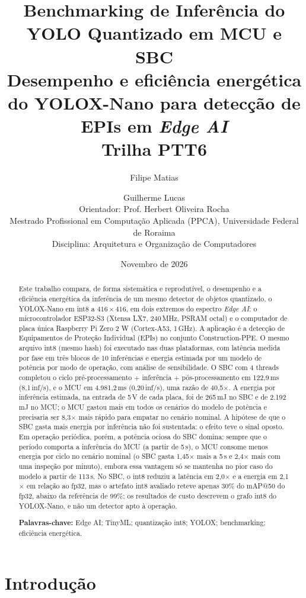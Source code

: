 \documentclass[11pt,a4paper]{article}
\title{\textbf{Benchmarking de Inferência do YOLO Quantizado em MCU e SBC}\\[2pt]
\large Desempenho e eficiência energética do YOLOX-Nano para detecção de EPIs em \emph{Edge AI}\\[2pt]
\normalsize Trilha PTT6}
\author{Filipe Matias \and Guilherme Lucas\\[2pt]
\small Orientador: Prof. Herbert Oliveira Rocha\\
\small Mestrado Profissional em Computação Aplicada (PPCA), Universidade Federal de Roraima\\
\small Disciplina: Arquitetura e Organização de Computadores}
\date{Novembro de 2026}
\begin{document}
\maketitle

\begin{abstract}
\noindent Este trabalho compara, de forma sistemática e reprodutível, o desempenho e a eficiência energética da
inferência de um mesmo detector de objetos quantizado, o YOLOX-Nano em int8 a $416\times416$, em dois
extremos do espectro \emph{Edge AI}: o microcontrolador ESP32-S3 (Xtensa LX7, 240\,MHz, PSRAM octal) e o
computador de placa única Raspberry Pi Zero 2 W (Cortex-A53, 1\,GHz). A aplicação é a detecção de Equipamentos de
Proteção Individual (EPIs) no conjunto Construction-PPE. O mesmo arquivo int8 (mesmo hash) foi executado nas duas
plataformas, com latência medida por fase em três blocos de 10 inferências e energia estimada por um modelo de
potência por modo de operação, com análise de sensibilidade. O SBC com 4 threads completou o ciclo
pré-processamento $+$ inferência $+$ pós-processamento em 122,9\,ms (8,1\,inf/s), e o MCU em 4.981,2\,ms
(0,20\,inf/s), uma razão de 40,5$\times$. A energia por inferência estimada, na entrada de 5\,V de cada placa, foi de 265\,mJ no SBC e de 2.192\,mJ no
MCU; o MCU gastou mais em todos os cenários do modelo de potência e precisaria ser 8,3$\times$ mais rápido para
empatar no cenário nominal. A hipótese de que o SBC gasta mais energia por inferência não foi sustentada: o efeito
teve o sinal oposto. Em operação periódica, porém, a potência ociosa do SBC domina: sempre que o período comporta
a inferência do MCU (a partir de 5\,s), o MCU consome menos energia por ciclo no cenário nominal (o SBC gasta 1,45$\times$ mais
a 5\,s e 2,4$\times$ mais com uma inspeção por minuto), embora essa vantagem só se mantenha no pior caso do modelo a
partir de 113\,s. No SBC, o int8 reduziu a latência em 2,0$\times$ e a energia em 2,1$\times$ em relação ao fp32,
mas o artefato int8 avaliado reteve apenas 30\% do mAP@50 do fp32, abaixo da referência de 99\%; os resultados de
custo descrevem o grafo int8 do YOLOX-Nano, e não um detector apto à operação.

\medskip\noindent\textbf{Palavras-chave:} Edge AI; TinyML; quantização int8; YOLOX; benchmarking; eficiência energética.
\end{abstract}

\section{Introdução}
\end{document}
